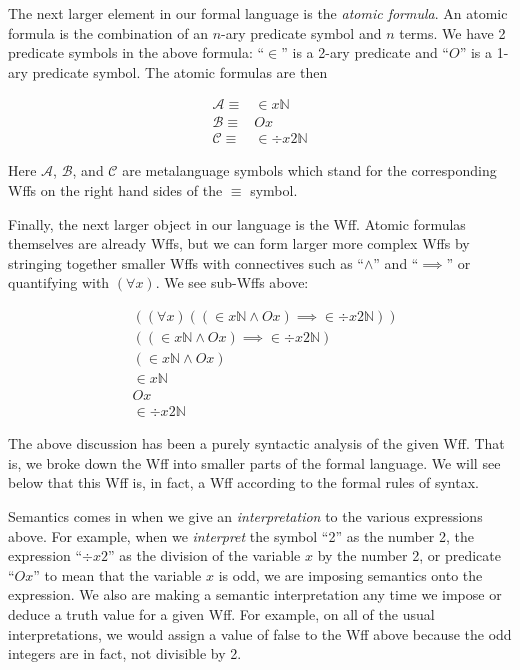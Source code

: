 \documentclass[12pt]{article}
\theoremstyle{break}
\theoremstyle{break}
\theoremstyle{break}
\theoremstyle{break}
\newcommand{\mc}[1]{\mathcal{#1}}
\newcommand{\qq}[1]{``#1''}
\begin{document}
The next larger element in our formal language is the \textit{atomic formula}.
An atomic formula is the combination of an $n$-ary predicate symbol and $n$ terms.
We have 2 predicate symbols in the above formula: \qq{$\in$} is a 2-ary predicate and \qq{$O$} is a 1-ary predicate symbol.
The atomic formulas are then

\begin{align}
\mc{A} \equiv& \in x \mathbb{N}\\
\mc{B} \equiv& Ox\\
\mc{C} \equiv& \in \div x2 \mathbb{N}
\end{align}

Here $\mc{A}$, $\mc{B}$, and $\mc{C}$ are metalanguage symbols which stand for the corresponding Wffs on the right hand sides of the $\equiv$ symbol.

Finally, the next larger object in our language is the Wff.
Atomic formulas themselves are already Wffs, but we can form larger more complex Wffs by stringing together smaller Wffs with connectives such as \qq{$\land$} and \qq{$\implies$} or quantifying with $(\forall x)$.
We see sub-Wffs above:

\begin{align}
& ((\forall x)((\in x \mathbb{N} \land Ox)\implies \in \div x 2 \mathbb{N})) \\
& ((\in x \mathbb{N} \land Ox)\implies \in \div x 2 \mathbb{N}) \\
& (\in x \mathbb{N} \land Ox)\\
& \in x \mathbb{N}\\
& Ox \\
&  \in \div x 2 \mathbb{N}
\end{align}

The above discussion has been a purely syntactic analysis of the given Wff.
That is, we broke down the Wff into smaller parts of the formal language.
We will see below that this Wff is, in fact, a Wff according to the formal rules of syntax.

Semantics comes in when we give an \textit{interpretation} to the various expressions above.
For example, when we \textit{interpret} the symbol \qq{2} as the number 2, the expression \qq{$\div x 2$} as the division of the variable $x$ by the number 2, or predicate \qq{$Ox$} to mean that the variable $x$ is odd, we are imposing semantics onto the expression.
We also are making a semantic interpretation any time we impose or deduce a truth value for a given Wff.
For example, on all of the usual interpretations, we would assign a value of false to the Wff above because the odd integers are in fact, not divisible by 2.
\end{document}
